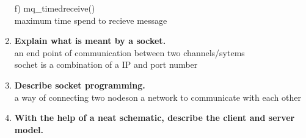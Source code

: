 \documentclass[a4paper,12pt]{article}
\begin{document}
\begin{flushleft}
\begin{enumerate}
 f) mq\_timedreceive()\\
{\color{red}maximum time spend to recieve message}\\
\item \textbf{ Explain what is meant by a socket.}\\
{\color{red}an end point of communication between two channels/sytems\\
sochet is a combination of a IP and port number}\\
\item \textbf{ Describe socket programming.}\\
{\color{red}a way of connecting two nodeson a network to communicate with each other}\\
\item \textbf{ With the help of a neat schematic, describe the client and server model.}\\


\end{enumerate}
\end{flushleft}
\end{document}
